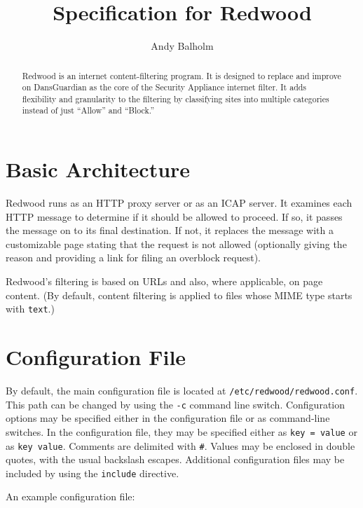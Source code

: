 \documentclass{article}
\title{Specification for Redwood}
\author{Andy Balholm}
\begin{document}
\maketitle

\begin{abstract}

Redwood is an internet content-filtering program. 
It is designed to replace and improve on DansGuardian 
as the core of the Security Appliance internet filter. 
It adds flexibility and granularity to the filtering by classifying sites 
into multiple categories instead of just ``Allow'' and ``Block.'' 

\end{abstract}

\section{Basic Architecture}

Redwood runs as an HTTP proxy server or as an ICAP server.
It examines each HTTP message to determine if it should be allowed to proceed. 
If so, it passes the message on 
to its final destination. If not, it replaces the message with a customizable page 
stating that the request is not allowed (optionally giving the reason 
and providing a link for filing an overblock request).

Redwood's filtering is based on URLs and also, where applicable, on page content. 
(By default, content filtering is applied to files whose MIME type starts with \verb"text".)

\section{Configuration File}

By default, the main configuration file is located at \verb"/etc/redwood/redwood.conf". 
This path can be changed by using the \verb"-c" command line switch. 
Configuration options may be specified either in the configuration file or as command-line
switches. In the configuration file, they may be specified either as
\verb"key = value" or as \verb"key value". Comments are delimited with \verb"#". 
Values may be enclosed in double quotes, with the usual backslash escapes.
Additional configuration files may be included by using the \verb"include" directive.

An example configuration file:
\end{document}
